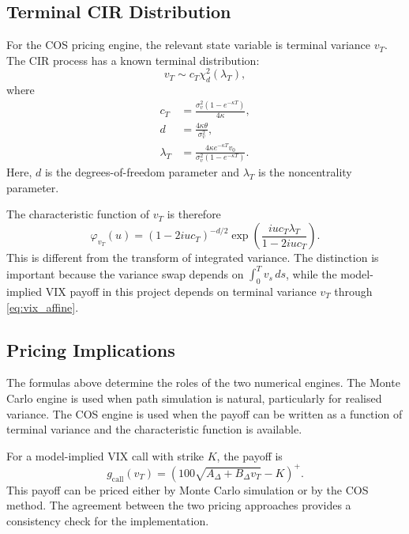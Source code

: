\subsection{Terminal CIR Distribution}

For the COS pricing engine, the relevant state variable is terminal variance \(v_T\). The CIR process has a known terminal distribution:
\begin{equation}
v_T
\sim
c_T\chi_d^2(\lambda_T),
\label{eq:cir_terminal_dist}
\end{equation}
where
\begin{align}
c_T
&=
\frac{\sigma_v^2(1-e^{-\kappa T})}{4\kappa},
\label{eq:c_t}\\
d
&=
\frac{4\kappa\theta}{\sigma_v^2},
\label{eq:d_cir}\\
\lambda_T
&=
\frac{4\kappa e^{-\kappa T}v_0}
{\sigma_v^2(1-e^{-\kappa T})}.
\label{eq:lambda_t}
\end{align}
Here, \(d\) is the degrees-of-freedom parameter and \(\lambda_T\) is the noncentrality parameter.

The characteristic function of \(v_T\) is therefore
\begin{equation}
\boxed{
\varphi_{v_T}(u)
=
(1-2iu c_T)^{-d/2}
\exp\left(
\frac{iu c_T\lambda_T}{1-2iu c_T}
\right).
}
\label{eq:terminal_cir_cf}
\end{equation}
This is different from the transform of integrated variance. The distinction is important because the variance swap depends on \(\int_0^T v_s\,ds\), while the model-implied VIX payoff in this project depends on terminal variance \(v_T\) through \eqref{eq:vix_affine}.

\subsection{Pricing Implications}

The formulas above determine the roles of the two numerical engines. The Monte Carlo engine is used when path simulation is natural, particularly for realised variance. The COS engine is used when the payoff can be written as a function of terminal variance and the characteristic function is available.

For a model-implied VIX call with strike \(K\), the payoff is
\begin{equation}
g_{\mathrm{call}}(v_T)
=
\left(
100\sqrt{A_\Delta+B_\Delta v_T}-K
\right)^+.
\label{eq:vix_call_payoff}
\end{equation}
This payoff can be priced either by Monte Carlo simulation or by the COS method. The agreement between the two pricing approaches provides a consistency check for the implementation.